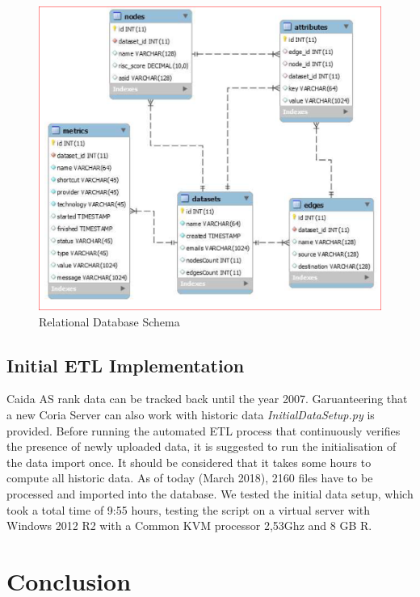 \documentclass[conference, 11pt]{IEEEtran}
\begin{document}
\vspace{0.5cm}
\begin{figure}[htbp]
\centerline{\includegraphics[scale=0.33]{Graphics/SQL_schema.PNG}}
\caption{Relational Database Schema}
\label{fig:SQL_schema}
\end{figure}
\vspace{0.5cm}

\subsection{Initial ETL Implementation}
Caida AS rank data can be tracked back until the year 2007. Garuanteering that a new Coria Server can also work with historic data \textit{InitialDataSetup.py} is provided. Before running the automated ETL process that continuously verifies the presence of newly uploaded data, it is suggested to run the initialisation of the data import once. It should be considered that it takes some hours to compute all historic data. As of today (March 2018), 2160 files have to be processed and imported into the database. We tested the initial data setup, which took a total time of  9:55 hours, testing the script on a virtual server with Windows 2012 R2 with a Common KVM processor 2,53Ghz and 8 GB R.  




\section{Conclusion}
\end{document}
